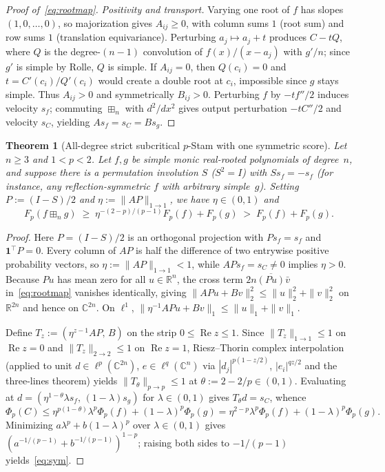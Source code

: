 \documentclass[11pt]{article}
\theoremstyle{plain}
\newtheorem{theorem}{Theorem}
\theoremstyle{definition}
\theoremstyle{remark}
\newcommand{\one}{\mathbf{1}}
\begin{document}
\begin{proof}[Proof of~\eqref{eq:rootmap}]
\emph{Positivity and transport.} Varying one root of $f$ has slopes $(1,0,\dots,0)$, so majorization gives $A_{ij} \ge 0$, with column sums $1$ (root sum) and row sums $1$ (translation equivariance). Perturbing $a_j \mapsto a_j + t$ produces $C - t Q$, where $Q$ is the degree-$(n-1)$ convolution of $f(x)/(x-a_j)$ with $g'/n$; since $g'$ is simple by Rolle, $Q$ is simple. If $A_{ij} = 0$, then $Q(c_i) = 0$ and $t = C'(c_i)/Q'(c_i)$ would create a double root at $c_i$, impossible since $g$ stays simple. Thus $A_{ij} > 0$ and symmetrically $B_{ij} > 0$. Perturbing $f$ by $-t f''/2$ induces velocity $s_f$; commuting $\boxplus_n$ with $d^2/dx^2$ gives output perturbation $-t C''/2$ and velocity $s_C$, yielding $A s_f = s_C = B s_g$.
\end{proof}

\begin{theorem}[All-degree strict subcritical $p$-Stam with one symmetric score]\label{thm:sym}
Let $n \ge 3$ and $1 < p < 2$. Let $f, g$ be simple monic real-rooted polynomials of degree~$n$, and suppose there is a permutation involution $S$ ($S^2 = I$) with $S s_f = -s_f$ (for instance, any reflection-symmetric $f$ with arbitrary simple~$g$). Setting $P := (I-S)/2$ and $\eta := \|AP\|_{1\to 1}$, we have $\eta \in (0,1)$ and
\begin{equation}\label{eq:sym}
F_p(f \boxplus_n g) \;\ge\; \eta^{-(2-p)/(p-1)} F_p(f) + F_p(g) \;>\; F_p(f) + F_p(g).
\end{equation}
\end{theorem}

\begin{proof}
Here $P = (I-S)/2$ is an orthogonal projection with $P s_f = s_f$ and $\one^\top P = 0$. Every column of $AP$ is half the difference of two entrywise positive probability vectors, so $\eta := \|AP\|_{1\to 1} < 1$, while $AP s_f = s_C \neq 0$ implies $\eta > 0$. Because $Pu$ has mean zero for all $u \in \mathbb{R}^n$, the cross term $2n \overline{(Pu)} \bar{v}$ in~\eqref{eq:rootmap} vanishes identically, giving $\|AP u + B v\|_2^2 \le \|u\|_2^2 + \|v\|_2^2$ on $\mathbb{R}^{2n}$ and hence on $\mathbb{C}^{2n}$. On $\ell^1$, $\|\eta^{-1} AP u + B v\|_1 \le \|u\|_1 + \|v\|_1$.

Define $T_z := (\eta^{z-1} AP,\, B)$ on the strip $0 \le \operatorname{Re} z \le 1$. Since $\|T_z\|_{1\to 1} \le 1$ on $\operatorname{Re} z = 0$ and $\|T_z\|_{2\to 2} \le 1$ on $\operatorname{Re} z = 1$, Riesz--Thorin complex interpolation (applied to unit $d \in \ell^p(\mathbb{C}^{2n})$, $e \in \ell^q(\mathbb{C}^n)$ via $|d_j|^{p(1-z/2)}$, $|e_i|^{qz/2}$ and the three-lines theorem) yields $\|T_\theta\|_{p\to p} \le 1$ at $\theta := 2 - 2/p \in (0,1)$. Evaluating at $d = (\eta^{1-\theta} \lambda s_f,\, (1-\lambda) s_g)$ for $\lambda \in (0,1)$ gives $T_\theta d = s_C$, whence
\[
\Phi_p(C) \le \eta^{p(1-\theta)} \lambda^p \Phi_p(f) + (1-\lambda)^p \Phi_p(g)
= \eta^{2-p} \lambda^p \Phi_p(f) + (1-\lambda)^p \Phi_p(g).
\]
Minimizing $a \lambda^p + b (1-\lambda)^p$ over $\lambda \in (0,1)$ gives $(a^{-1/(p-1)} + b^{-1/(p-1)})^{1-p}$; raising both sides to $-1/(p-1)$ yields~\eqref{eq:sym}.
\end{proof}
\end{document}
